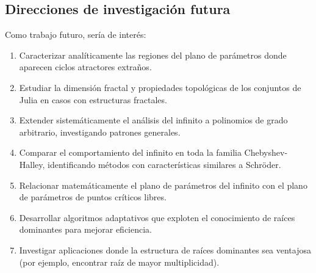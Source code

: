 \subsection{Direcciones de investigación futura}

Como trabajo futuro, sería de interés:

\begin{enumerate}
\item Caracterizar analíticamente las regiones del plano de parámetros donde aparecen ciclos atractores extraños.

\item Estudiar la dimensión fractal y propiedades topológicas de los conjuntos de Julia en casos con estructuras fractales.

\item Extender sistemáticamente el análisis del infinito a polinomios de grado arbitrario, investigando patrones generales.

\item Comparar el comportamiento del infinito en toda la familia Chebyshev-Halley, identificando métodos con características similares a Schröder.

\item Relacionar matemáticamente el plano de parámetros del infinito con el plano de parámetros de puntos críticos libres.

\item Desarrollar algoritmos adaptativos que exploten el conocimiento de raíces dominantes para mejorar eficiencia.

\item Investigar aplicaciones donde la estructura de raíces dominantes sea ventajosa (por ejemplo, encontrar raíz de mayor multiplicidad).
\end{enumerate}


